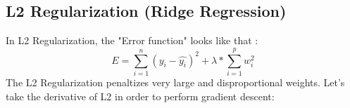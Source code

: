 \documentclass{article}
\begin{document}
\subsection{L2 Regularization (Ridge Regression)}
In L2 Regularization, the "Error function" looks like that :
\begin{equation*}
E = \sum_{i=1}^{n}(y_i - \hat{y_i})^2 + \lambda * \sum_{i=1}^{p}w_i^2
\end{equation*}
The L2 Regularization penaltizes very large and disproportional weights. Let's take the derivative of L2 in order to perform gradient descent:
\end{document}
